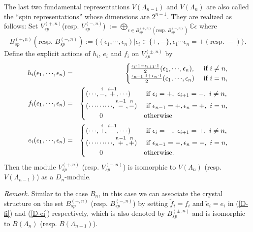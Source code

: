 The last two fundamental representations $V({\Lambda}_{n-1})$ and $V({\Lambda}_n)$ 
are also called the ``spin representations'' whose dimensions
are $2^{n-1}$. They are realized as follows:
Set $V^{(+,n)}_{sp}$(resp. $V^{(-,n)}_{sp}$)
$:=\bigoplus_{{\epsilon}\in
B^{(+,n)}_{sp}(\text{resp. }B^{(-,n)}_{sp})}{\mathbb C}{\epsilon}$ 
where
\[
 B^{(+,n)}_{sp}(\text{resp. }B^{(-,n)}_{sp})
:=\{({\epsilon}_1,{\cdots},{\epsilon}_n)|{\epsilon}_i\in\{+,-\},{\epsilon}_1{\cdots}{\epsilon}_n=+(\text{resp. }-)\}.
\]
Define the explicit actions of $h_i$, $e_i$ and $f_i$ on 
$V^{(\pm,n)}_{sp}$ by 
\begin{eqnarray}
h_i({\epsilon}_1,{\cdots},{\epsilon}_n)&=&\begin{cases}
\frac{{\epsilon}_i\cdot1-{\epsilon}_{i+1}\cdot1}{2}
({\epsilon}_1,{\cdots},{\epsilon}_n),&\text{ if }i\ne n,\\
\frac{{\epsilon}_{n-1}\cdot1+{\epsilon}_n\cdot1}{2}({\epsilon}_1,{\cdots},{\epsilon}_n)&\text{ if }i=n,
\end{cases}\\
f_i({\epsilon}_1,{\cdots},{\epsilon}_n)&=&\begin{cases}
({\cdots},\buildrel{i}\over-,\buildrel{i+1}\over+,{\cdots})
&\text{ if }{\epsilon}_i=+,\,\,{\epsilon}_{i+1}=-,\,\,
i\ne n,\\
({\cdots}{\cdots}{\cdots},\buildrel{n-1}\over-,\buildrel{n}\over-)
&\text{ if }{\epsilon}_{n-1}=+,{\epsilon}_n=+,\,\,i=n,\\
{\qquad}0&\text{otherwise}
\end{cases}
\label{D-fi}
\\
e_i({\epsilon}_1,{\cdots},{\epsilon}_n)&=&\begin{cases}
({\cdots},\buildrel{i}\over+,\buildrel{i+1}\over-,{\cdots})
&\text{ if }{\epsilon}_i=-,\,\,{\epsilon}_{i+1}=+,\,\,
i\ne n,\\
({\cdots}{\cdots}{\cdots},\buildrel{n-1}\over+,\buildrel{n}\over+)
&\text{ if }{\epsilon}_{n-1}=-,{\epsilon}_n=-,\,\,i=n,\\
{\qquad}0&\text{otherwise.}
\end{cases}
\label{D-ei}
\end{eqnarray}
Then the module $V^{(+,n)}_{sp}$ (resp. $V^{(-,n)}_{sp}$) is isomorphic to 
$V({\Lambda}_n)$ (resp. $V({\Lambda}_{n-1})$) as a $D_n$-module.

{\sl Remark.}
Similar to the case $B_n$, in this case 
we can associate the crystal structure on the set $B^{(+,n)}_{sp}$ 
(resp. $B^{(-,n)}_{sp}$) by 
setting ${\tilde{f}_i}=f_i$ and ${\tilde{e}_i}=e_i$ in (\ref{D-fi}) and (\ref{D-ei})
respectively, which is also denoted by $B^{(\pm,n)}_{sp}$ and is isomorphic
to $B({\Lambda}_n)$ (resp. $B({\Lambda}_{n-1})$).

